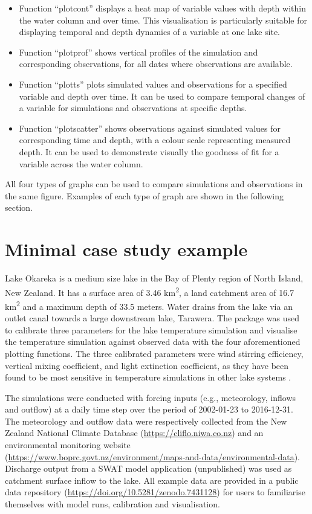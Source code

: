 \begin{itemize}
    \item Function “plot\textunderscore{}cont” displays a heat map of variable values with depth within the water column and over time. This visualisation is particularly suitable for displaying temporal and depth dynamics of a variable at one lake site.
    \item Function “plot\textunderscore{}prof” shows vertical profiles of the simulation and corresponding observations, for all dates where observations are available.
    \item Function “plot\textunderscore{}ts” plots simulated values and observations for a specified variable and depth over time. It can be used to compare temporal changes of a variable for simulations and observations at specific depths.
    \item Function “plot\textunderscore{}scatter” shows observations against simulated values for corresponding time and depth, with a colour scale representing measured depth. It can be used to demonstrate visually the goodness of fit for a variable across the water column.
\end{itemize}

All four types of graphs can be used to compare simulations and observations in the same figure. Examples of each type of graph are shown in the following section.

\section{Minimal case study example}
Lake Okareka is a medium size lake in the Bay of Plenty region of North Island, New Zealand. It has a surface area of 3.46 km\textsuperscript{2}, a land catchment area of 16.7 km\textsuperscript{2} and a maximum depth of 33.5 meters. Water drains from the lake via an outlet canal towards a large downstream lake, Tarawera. The  package was used to calibrate three parameters for the lake temperature simulation and visualise the temperature simulation against observed data with the four aforementioned plotting functions. The three calibrated parameters were wind stirring efficiency, vertical mixing coefficient, and light extinction coefficient, as they have been found to be most sensitive in temperature simulations in other lake systems \citep{weinberger2012using}. \par

The simulations were conducted with forcing inputs (e.g., meteorology, inflows and outflow) at a daily time step over the period of 2002-01-23 to 2016-12-31. The meteorology and outflow data were respectively collected from the New Zealand National Climate Database (\url{https://cliflo.niwa.co.nz}) and an environmental monitoring website (\url{https://www.boprc.govt.nz/environment/maps-and-data/environmental-data}). Discharge output from a SWAT model application (unpublished) was used as catchment surface inflow to the lake. All example data are provided in a public data repository (\url{https://doi.org/10.5281/zenodo.7431128}) for users to familiarise themselves with model runs, calibration and visualisation. \par

